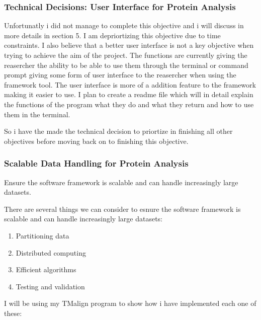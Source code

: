 \documentclass[]{final_report}
\begin{document}
\subsubsection{Technical Decisions: User Interface for Protein Analysis}
Unfortunatly i did not manage to complete this objective and i will discuss in more details in section 5. I am depriortizing this objective due to time constraints. I also believe that a better user interface is not a key objective when trying to achieve the aim of the project. The functions are currently giving the reasercher the ability to be able to use them through the terminal or command prompt giving some form of user interface to the reasercher when using the framework tool. The user interface is more of a addition feature to the framework making it easier to use. I plan to create a readme file which will in detail explain the functions of the program what they do and what they return and how to use them in the terminal.

So i have the made the technical decision to priortize in finishing all other objectives before moving back on to finishing this objective.

\clearpage

\subsubsection{Scalable Data Handling for Protein Analysis}
\begin{displayquote}
    Ensure the software framework is scalable and can handle increasingly large datasets.
\end{displayquote}

There are several things we can consider to esnure the software framework is scalable and can handle increasingly large datasets:

\begin{enumerate}
    \item Partitioning data
    \item Distributed computing
    \item Efficient algorithms
    \item Testing and validation
\end{enumerate}

I will be using my TMalign program to show how i have implemented each one of these:
\end{document}
